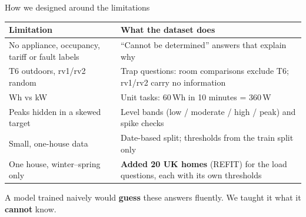 \documentclass[aspectratio=169,11pt]{beamer}
\newcommand{\speaker}[1]{\gdef\thespeaker{#1}}\gdef\thespeaker{}
\newcommand{\warn}[1]{{\color{accent}\textbf{#1}}}
\begin{document}
\speaker{Speaker B}
\begin{frame}{How we designed around the limitations}
  \small
  \begin{tabularx}{\textwidth}{@{}>{\raggedright\arraybackslash}p{} L@{}}
    \toprule
    \textbf{Limitation} & \textbf{What the dataset does} \\
    \midrule
    No appliance, occupancy, tariff or fault labels & ``Cannot be determined'' answers that explain why \\
    T6 outdoors, rv1/rv2 random & Trap questions: room comparisons exclude T6; rv1/rv2 carry no information \\
    Wh vs kW & Unit tasks: 60\,Wh in 10 minutes = 360\,W \\
    Peaks hidden in a skewed target & Level bands (low / moderate / high / peak) and spike checks \\
    Small, one-house data & Date-based split; thresholds from the train split only \\
    One house, winter--spring only & \textbf{Added 20 UK homes} (REFIT) for the load questions, each with its own thresholds \\
    \bottomrule
  \end{tabularx}
  \vspace{0.8em}

  \small A model trained naively would \warn{guess} these answers fluently. We taught it what it \textbf{cannot} know.
\end{frame}
\end{document}
